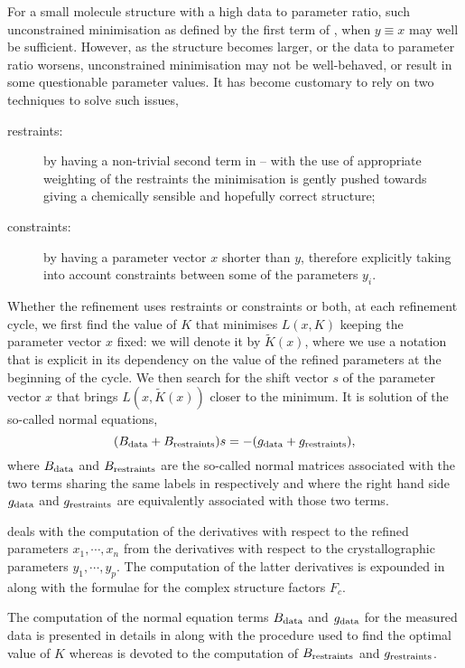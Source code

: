 \documentclass[pdf]{iucr}
\begin{document}
For a small molecule structure with a high data to parameter ratio, such unconstrained minimisation as defined by the first term of , when $y \equiv x$ may well be sufficient. However, as the structure becomes larger, or the data to parameter ratio worsens, unconstrained minimisation may not be well-behaved, or result in some questionable parameter values. It has become customary to rely on two techniques to solve such issues,
\begin{description}
\item[restraints:] by having a non-trivial second term in  -- with the use of appropriate weighting of the restraints the minimisation is gently pushed towards giving a chemically sensible and hopefully correct structure;
\item[constraints:] by having a parameter vector $x$ shorter than $y$, therefore explicitly taking into account constraints between some of the parameters $y_i$.
\end{description}

Whether the refinement uses restraints or constraints or both, at each refinement cycle, we first find the value of $K$ that minimises $L(x, K)$ keeping the parameter vector $x$ fixed: we will denote it by $\tilde{K}(x)$, where we use a notation that is explicit in its dependency on the value of the refined parameters at the beginning of the cycle. We then search for the shift vector $s$ of the parameter vector $x$ that brings $L(x, \tilde{K}(x))$ closer to the minimum. It is solution of the so-called normal equations,
\begin{equation}
(B_{\text{data}} + B_{\text{restraints}})s = -(g_{\text{data}} + g_{\text{restraints}}),
\label{eqn:generalnormalequations}
\end{equation}
where $B_{\text{data}}$ and $B_{\text{restraints}}$ are the so-called normal matrices associated with the two terms sharing the same labels in  respectively and where the right hand side $g_{\text{data}}$ and $g_{\text{restraints}}$ are equivalently associated with those two terms.

 deals with the computation of the derivatives with respect to the refined parameters $x_1, \cdots, x_n$ from the derivatives with respect to the crystallographic parameters $y_1, \cdots, y_p$. The computation of the latter derivatives is expounded in  along with the formulae for the complex structure factors $F_c$.

The computation of the normal equation terms $B_{\text{data}}$ and $g_{\text{data}}$ for the measured data is presented in details in  along with the procedure used to find the optimal value of $K$ whereas  is devoted to the computation of $B_{\text{restraints}}$ and $g_{\text{restraints}}$.
\end{document}
